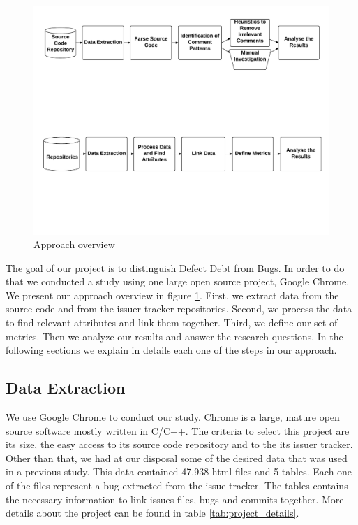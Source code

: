 \begin{figure}[thb!]
  \caption{Approach overview}
  \centering
  \label{fig:approach}
  \includegraphics[width=1\textwidth]{figures/approach}
\end{figure}

The goal of our project is to distinguish Defect Debt from Bugs. In order to do that we conducted a study using one large open source project, Google Chrome. We present our approach overview in figure \ref{fig:approach}. First, we extract data from the source code and from the issuer tracker repositories. Second,  we process the data to find relevant attributes and link them together. Third, we define our set of metrics. Then we analyze our results and answer the research questions. In the following sections we explain in details each one of the steps in our approach.   

\subsection{Data Extraction}

We use Google Chrome to conduct our study. Chrome is a large, mature open source software mostly written in C/C++. The criteria to select this project are its size, the easy access to its source code repository and to the its issuer tracker. Other than that, we had at our disposal some of the desired data that was used in a previous study. This data contained 47.938 html files and 5 tables. Each one of the files represent a bug extracted from the issue tracker. The tables contains the necessary information to link issues files, bugs and commits together. More details about the project can be found in table \ref{tab:project_details}.

